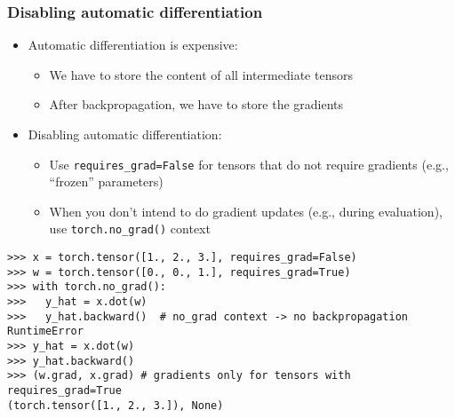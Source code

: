 \begin{frame}[fragile]
\frametitle{Disabling automatic differentiation}
\begin{itemize}
	\item Automatic differentiation is expensive:
	\begin{itemize}
	\item We have to store the content of all intermediate tensors
	\item After backpropagation, we have to store the gradients
	\end{itemize}
	\item Disabling automatic differentiation:
	\begin{itemize}
	\item Use \texttt{requires\_grad=False} for tensors that do not require gradients (e.g., ``frozen'' parameters)
	\item When you don't intend to do gradient updates (e.g., during evaluation), use \texttt{torch.no\_grad()} context 
	\end{itemize}
\end{itemize}
\begin{verbatim}
>>> x = torch.tensor([1., 2., 3.], requires_grad=False)
>>> w = torch.tensor([0., 0., 1.], requires_grad=True)
>>> with torch.no_grad(): 
>>>   y_hat = x.dot(w)
>>>   y_hat.backward()  # no_grad context -> no backpropagation
RuntimeError
>>> y_hat = x.dot(w)
>>> y_hat.backward() 
>>> (w.grad, x.grad) # gradients only for tensors with requires_grad=True
(torch.tensor([1., 2., 3.]), None)
\end{verbatim}
\end{frame}
	
	

